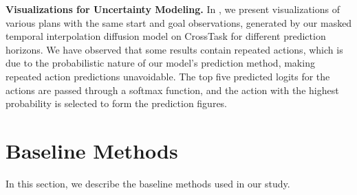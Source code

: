 \textbf{Visualizations for Uncertainty Modeling.} In , we present visualizations of various plans with the same start and goal observations, generated by our masked temporal interpolation diffusion model on CrossTask for different prediction horizons. We have observed that some results contain repeated actions, which is due to the probabilistic nature of our model's prediction method, making repeated action predictions unavoidable. The top five predicted logits for the actions are passed through a softmax function, and the action with the highest probability is selected to form the prediction figures. 

\section{Baseline Methods}
In this section, we describe the baseline methods used in our study.
